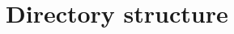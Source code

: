 \documentclass[aspectratio=169]{beamer}
\begin{document}
\appendixstyle

\appendix

\section{Directory structure}
\end{document}

